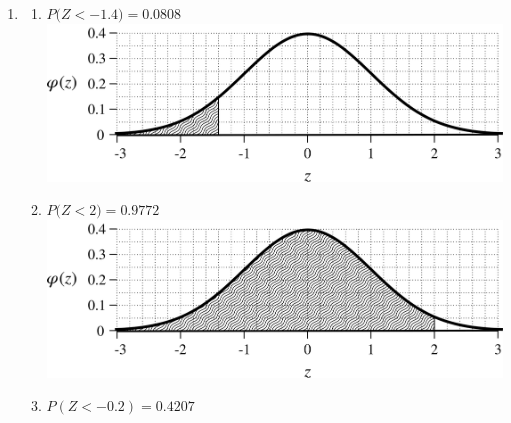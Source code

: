 \documentclass[12pt,letterpaper]{article}
\begin{document}
\begin{multicols}{2}
\begin{enumerate}
\item \begin{enumerate}
\item $P\bigl(Z < -1.4\bigr) = 0.0808 $\\\includegraphics[scale=0.4]{n1p4.png}
\item $P\bigl(Z < 2\bigr) = 0.9772 $\\\includegraphics[scale=0.4]{2.png}
\item $P(Z<-0.2) = 0.4207$
\end{enumerate}


\end{enumerate}
\end{multicols}
\end{document}
